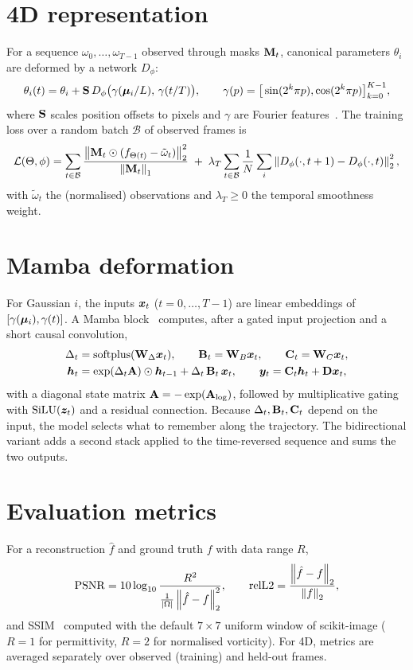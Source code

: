 \section{4D representation}
For a sequence $\omega_0,\dots,\omega_{T-1}$ observed through masks $\mathbf{M}_t$, canonical parameters $\theta_i$ are
deformed by a network $D_\phi$:
\begin{equation}
  \theta_i(t) = \theta_i + \mathbf{S}\,D_\phi\big(\gamma(\bm{\mu}_i/L),\,\gamma(t/T)\big),
  \qquad \gamma(p) = \big[\sin(2^k\pi p),\cos(2^k\pi p)\big]_{k=0}^{K-1},
\end{equation}
where $\mathbf{S}$ scales position offsets to pixels and $\gamma$ are Fourier features~\citep{tancik2020fourier}. The
training loss over a random batch $\mathcal{B}$ of observed frames is
\begin{equation}
  \mathcal{L}(\Theta,\phi) = \sum_{t\in\mathcal{B}}
    \frac{\left\lVert \mathbf{M}_t\odot(f_{\Theta(t)}-\tilde\omega_t) \right\rVert_2^2}{\left\lVert \mathbf{M}_t \right\rVert_1}
  \;+\; \lambda_T \sum_{t\in\mathcal{B}}\frac{1}{N}\sum_i \left\lVert D_\phi(\cdot,t+1)-D_\phi(\cdot,t) \right\rVert_2^2 ,
\end{equation}
with $\tilde\omega_t$ the (normalised) observations and $\lambda_T\ge0$ the temporal smoothness weight.

\section{Mamba deformation}
For Gaussian $i$, the inputs $\bm{x}_t$ ($t=0,\dots,T-1$) are linear embeddings of $[\gamma(\bm{\mu}_i),\gamma(t)]$.
A Mamba block~\citep{gu2023mamba} computes, after a gated input projection and a short causal convolution,
\begin{align}
  \Delta_t &= \mathrm{softplus}(\mathbf{W}_\Delta \bm{x}_t), \qquad \mathbf{B}_t = \mathbf{W}_B\bm{x}_t, \qquad \mathbf{C}_t = \mathbf{W}_C\bm{x}_t,\\
  \bm{h}_t &= \exp(\Delta_t\mathbf{A})\odot\bm{h}_{t-1} + \Delta_t\,\mathbf{B}_t\,\bm{x}_t, \qquad
  \bm{y}_t = \mathbf{C}_t\bm{h}_t + \mathbf{D}\bm{x}_t,
\end{align}
with a diagonal state matrix $\mathbf{A}=-\exp(\mathbf{A}_{\log})$, followed by multiplicative gating with
$\mathrm{SiLU}(\bm{z}_t)$ and a residual connection. Because $\Delta_t,\mathbf{B}_t,\mathbf{C}_t$ depend on the input, the
model selects what to remember along the trajectory. The bidirectional variant adds a second stack applied to the
time-reversed sequence and sums the two outputs.

\section{Evaluation metrics}
For a reconstruction $\hat f$ and ground truth $f$ with data range $R$,
\begin{equation}
  \mathrm{PSNR} = 10\log_{10}\frac{R^2}{\frac{1}{|\Omega|}\left\lVert \hat f-f \right\rVert_2^2}, \qquad
  \mathrm{relL2} = \frac{\left\lVert \hat f-f \right\rVert_2}{\left\lVert f \right\rVert_2},
\end{equation}
and SSIM~\citep{wang2004ssim} computed with the default $7\times7$ uniform window of scikit-image ($R=1$ for permittivity,
$R=2$ for normalised vorticity). For 4D, metrics are averaged separately over observed (training) and held-out frames.
